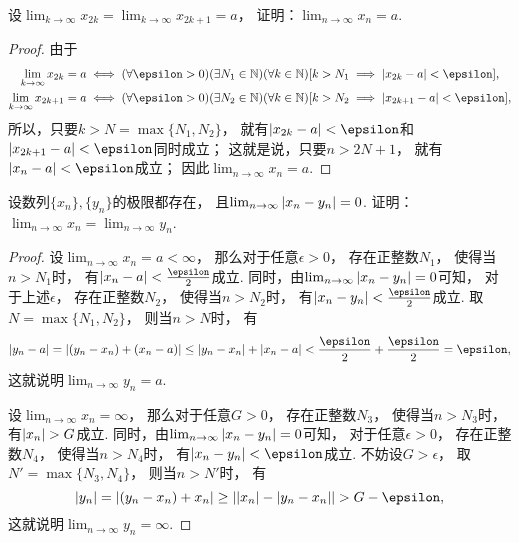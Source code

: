 \begin{example}\label{example:数列极限.奇偶子列收敛则数列收敛}
设\(\lim_{k\to\infty} x_{2k} = \lim_{k\to\infty} x_{2k+1} = a\)，
证明：\(\lim_{n\to\infty} x_n = a\).
\begin{proof}
由于\begin{gather*}
	\lim_{k\to\infty} x_{2k} = a
	\iff
	(\forall\epsilon>0)
	(\exists N_1\in\mathbb{N})
	(\forall k\in\mathbb{N})
	[
		k>N_1
		\implies
		\abs{x_{2k}-a}<\epsilon
	], \\
	\lim_{k\to\infty} x_{2k+1} = a
	\iff
	(\forall\epsilon>0)
	(\exists N_2\in\mathbb{N})
	(\forall k\in\mathbb{N})
	[
		k>N_2
		\implies
		\abs{x_{2k+1}-a}<\epsilon
	],
\end{gather*}
所以，只要\(k>N=\max\{N_1,N_2\}\)，
就有\(\abs{x_{2k}-a}<\epsilon\)和\(\abs{x_{2k+1}-a}<\epsilon\)同时成立；
这就是说，只要\(n>2N+1\)，
就有\(\abs{x_n-a}<\epsilon\)成立；
因此\(\lim_{n\to\infty} x_n = a\).
\end{proof}
\end{example}

\begin{example}\label{example:数列极限的概念.柯西列的等价性}
设数列\(\{x_n\},\{y_n\}\)的极限都存在，
且\(\lim_{n\to\infty} \abs{x_n - y_n} = 0\).
证明：\(\lim_{n\to\infty} x_n = \lim_{n\to\infty} y_n\).
\begin{proof}
设\(\lim_{n\to\infty} x_n = a < \infty\)，
那么对于任意\(\epsilon>0\)，
存在正整数\(N_1\)，
使得当\(n > N_1\)时，
有\(\abs{x_n - a} < \frac\epsilon2\)成立.
同时，由\(\lim_{n\to\infty} \abs{x_n - y_n} = 0\)可知，
对于上述\(\epsilon\)，
存在正整数\(N_2\)，
使得当\(n > N_2\)时，
有\(\abs{x_n - y_n} < \frac\epsilon2\)成立.
取\(N = \max\{N_1,N_2\}\)，
则当\(n > N\)时，
有\begin{equation*}
	\abs{y_n - a}
	= \abs{(y_n - x_n) + (x_n - a)}
	\leq \abs{y_n - x_n} + \abs{x_n - a}
	< \frac\epsilon2 + \frac\epsilon2
	= \epsilon,
\end{equation*}
这就说明\(\lim_{n\to\infty} y_n = a\).

设\(\lim_{n\to\infty} x_n = \infty\)，
那么对于任意\(G>0\)，
存在正整数\(N_3\)，
使得当\(n > N_3\)时，
有\(\abs{x_n} > G\)成立.
同时，由\(\lim_{n\to\infty} \abs{x_n - y_n} = 0\)可知，
对于任意\(\epsilon>0\)，
存在正整数\(N_4\)，
使得当\(n > N_4\)时，
有\(\abs{x_n - y_n} < \epsilon\)成立.
不妨设\(G > \epsilon\)，
取\(N' = \max\{N_3,N_4\}\)，
则当\(n > N'\)时，
有\begin{equation*}
	\abs{y_n}
	= \abs{(y_n - x_n) + x_n}
	\geq \abs{
		\abs{x_n} - \abs{y_n - x_n}
	}
	> G - \epsilon,
\end{equation*}
这就说明\(\lim_{n\to\infty} y_n = \infty\).
\end{proof}
\end{example}
